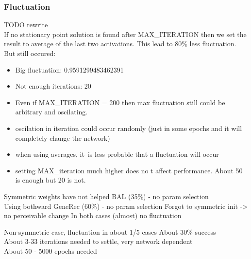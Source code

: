 \subsubsection*{Fluctuation} 
\label{sec:generec-fluctuation}

TODO rewrite \\ 

If no stationary point solution is found after MAX\_ITERATION then we set the result to average of the last two activations. This lead to 80\% less fluctuation. But still occured: 
\begin{itemize}
\item Big fluctuation: 0.9591299483462391
\item Not enough iterations: 20
\item Even if MAX\_ITERATION = 200 then max fluctuation still could be arbitrary and oscilating.
\end{itemize} 

\begin{itemize} 
  \item oscilation in iteration could occur randomly (just in some epochs and it will completely change the network) 
  \item when using averages, it~is less probable that a fluctuation will occur 
  \item setting MAX\_iteration much higher does no t affect performance. About 50 is enough but 20 is not. 
\end{itemize} 
  
Symmetric weights have not helped BAL (35\%) - no param selection \\ 
Using bothward GeneRec (60\%) - no param selection 
  Forgot to symmetric init -> no perceivable change 
In both cases (almost) no fluctuation 

Non-symmetric case, fluctuation in about 1/5 cases 
  About 30\% success \\
  About 3-33 iterations needed to settle, very network dependent  \\
  About 50 - 5000 epochs needed  \\

